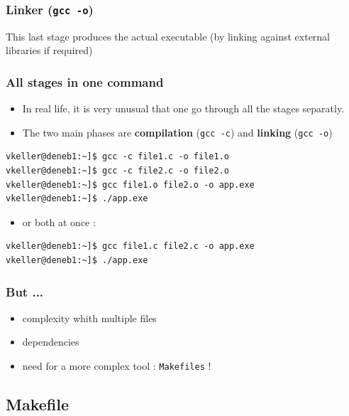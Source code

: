 \begin{frame}[containsverbatim]
\frametitle{Linker ({\tt gcc -o})}
\begin{alertblock}{}
This last stage produces the actual executable (by linking against external libraries if required)
\end{alertblock}
\end{frame}


\begin{frame}[containsverbatim]
\frametitle{All stages in one command}

\begin{itemize}
	\item In real life, it is very unusual that one go through all the stages separatly.
	\item The two main phases are {\bf compilation} ({\tt gcc -c}) and {\bf linking} ({\tt gcc -o})
\end{itemize}

\begin{verbatim}
vkeller@deneb1:~]$ gcc -c file1.c -o file1.o
vkeller@deneb1:~]$ gcc -c file2.c -o file2.o
vkeller@deneb1:~]$ gcc file1.o file2.o -o app.exe
vkeller@deneb1:~]$ ./app.exe
\end{verbatim}

\begin{itemize}
	\item or both at once :
\end{itemize}

\begin{verbatim}
vkeller@deneb1:~]$ gcc file1.c file2.c -o app.exe
vkeller@deneb1:~]$ ./app.exe
\end{verbatim}
\end{frame}

\begin{frame}
\frametitle{But ...}

\begin{itemize}
	\item complexity whith multiple files
	\item dependencies
	\item need for a more complex tool : {\tt Makefiles} !
\end{itemize}
\end{frame}


\subsection{Makefile}

